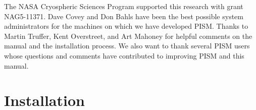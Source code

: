 \documentclass[11pt,final]{amsart}
\begin{document}
The NASA Cryospheric Sciences Program supported this research with grant NAG5-11371.  Dave Covey and Don Bahls have been the best possible system administrators for the machines on which we have developed PISM.  Thanks to Martin Truffer, Kent Overstreet, and Art Mahoney for helpful comments on the manual and the installation process.  We also want to thank several PISM users whose questions and comments have contributed to improving PISM and this manual.

\newpage
\setcounter{tocdepth}{2}
\tableofcontents


\newpage
\section{Installation}\label{sect:install}

\renewcommand{\labelenumi}{\textbf{\arabic{enumi}.}~}
\end{document}
